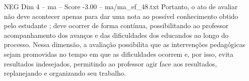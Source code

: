 \begin{textsample}{NEG Dim 4 – ma – Score -3.00 – ma/ma\_ef\_48.txt}
Portanto, o ato de avaliar não deve acontecer apenas para dar uma nota ao possível conhecimento obtido pelo estudante ; deve ocorrer de forma contínua, possibilitando ao professor acompanhamento dos avanços e das dificuldades dos educandos ao longo do processo.
Nessa dimensão, a avaliação possibilita que as intervenções pedagógicas sejam promovidas no tempo em que as dificuldades ocorrem e, por isso, evita resultados indesejados, permitindo ao professor agir face aos resultados, replanejando e organizando seu trabalho.

\end{textsample}
